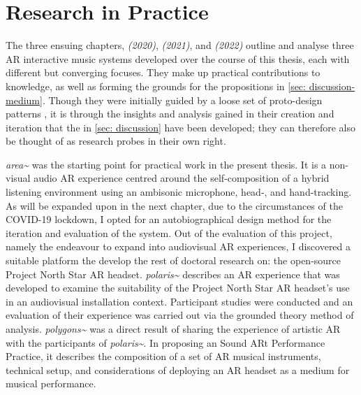 \section{Research in Practice}
The three ensuing chapters, \textit{ (2020)}, \textit{ (2021)}, and \textit{ (2022)} outline and analyse three AR interactive music systems developed over the course of this thesis, each with different but converging focuses. They make up practical contributions to knowledge, as well as forming the grounds for the propositions in \autoref{sec: discussion-medium}. Though they were initially guided by a loose set of proto-design patterns \citep{bilbow2020}, it is through the insights and analysis gained in their creation and iteration that the  in \autoref{sec: discussion} have been developed; they can therefore also be thought of as research probes in their own right.

\textit{area\textasciitilde{}} was the starting point for practical work in the present thesis. It is a non-visual audio AR experience centred around the self-composition of a hybrid listening environment using an ambisonic microphone, head-, and hand-tracking. As will be expanded upon in the next chapter, due to the circumstances of the COVID-19 lockdown, I opted for an autobiographical design method for the iteration and evaluation of the system. Out of the evaluation of this project, namely the endeavour to expand into audiovisual AR experiences, I discovered a suitable platform the develop the rest of doctoral research on: the open-source Project North Star AR headset. \textit{polaris\textasciitilde{}} describes an AR experience that was developed to examine the suitability of the Project North Star AR headset's use in an audiovisual installation context. Participant studies were conducted and an evaluation of their experience was carried out via the grounded theory method of analysis. \textit{polygons\textasciitilde{}} was a direct result of sharing the experience of artistic AR with the participants of \textit{polaris\textasciitilde{}}. In proposing an Sound ARt Performance Practice, it describes the composition of a set of AR musical instruments, technical setup, and considerations of deploying an AR headset as a medium for musical performance.
